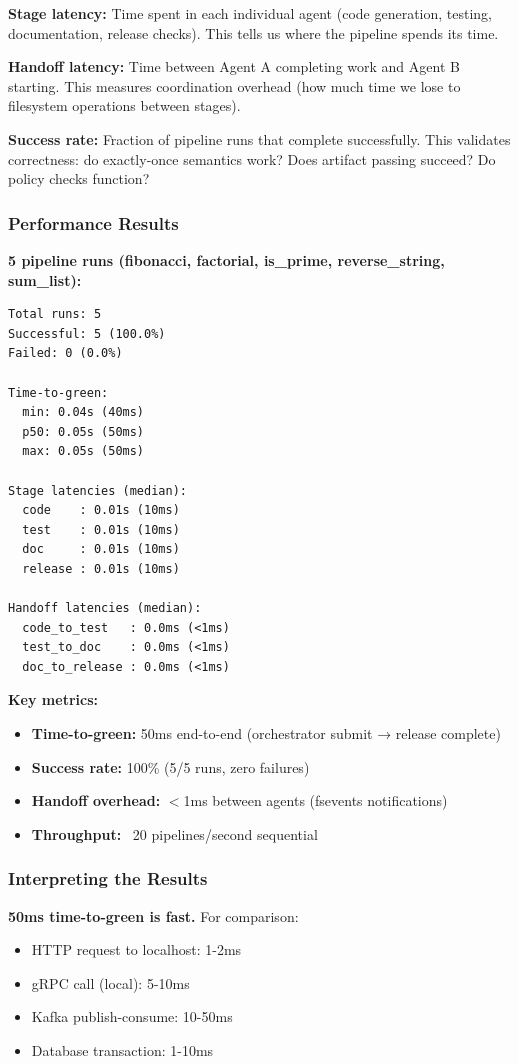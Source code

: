 \documentclass[11pt]{article}
\begin{document}
\textbf{Stage latency:} Time spent in each individual agent (code generation, testing, documentation, release checks). This tells us where the pipeline spends its time.

\textbf{Handoff latency:} Time between Agent A completing work and Agent B starting. This measures coordination overhead (how much time we lose to filesystem operations between stages).

\textbf{Success rate:} Fraction of pipeline runs that complete successfully. This validates correctness: do exactly-once semantics work? Does artifact passing succeed? Do policy checks function?

\subsubsection{Performance Results}

\textbf{5 pipeline runs (fibonacci, factorial, is\_prime, reverse\_string, sum\_list):}

\begin{lstlisting}
Total runs: 5
Successful: 5 (100.0%)
Failed: 0 (0.0%)

Time-to-green:
  min: 0.04s (40ms)
  p50: 0.05s (50ms)
  max: 0.05s (50ms)

Stage latencies (median):
  code    : 0.01s (10ms)
  test    : 0.01s (10ms)
  doc     : 0.01s (10ms)
  release : 0.01s (10ms)

Handoff latencies (median):
  code_to_test   : 0.0ms (<1ms)
  test_to_doc    : 0.0ms (<1ms)
  doc_to_release : 0.0ms (<1ms)
\end{lstlisting}

\textbf{Key metrics:}
\begin{itemize}
\item \textbf{Time-to-green:} 50ms end-to-end (orchestrator submit → release complete)
\item \textbf{Success rate:} 100\% (5/5 runs, zero failures)
\item \textbf{Handoff overhead:} $<$1ms between agents (fsevents notifications)
\item \textbf{Throughput:} ~20 pipelines/second sequential
\end{itemize}

\subsubsection{Interpreting the Results}

\textbf{50ms time-to-green is fast.} For comparison:
\begin{itemize}
\item HTTP request to localhost: 1-2ms
\item gRPC call (local): 5-10ms
\item Kafka publish-consume: 10-50ms
\item Database transaction: 1-10ms
\end{itemize}
\end{document}
